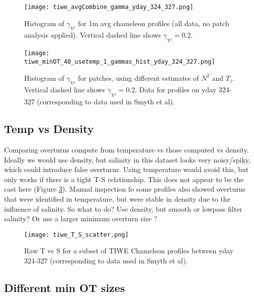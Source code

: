 \documentclass[11pt]{article}
\begin{document}
\begin{figure}[htbp]
\texttt{[image: tiwe\_avgCombine\_gamma\_yday\_324\_327.png]}
\caption{Histogram of $\gamma_{\chi\epsilon}$ for 1m avg chameleon profiles (all data, no patch analysis applied). Vertical dashed line shows $\gamma_{\chi\epsilon}=0.2$.}
\label{avggam}
\end{figure}


\begin{figure}[htbp]
\texttt{[image: tiwe\_minOT\_40\_usetemp\_1\_gammas\_hist\_yday\_324\_327.png]}
\caption{Histogram of $\gamma_{\chi\epsilon}$ for patches, using different estimates of $N^2$ and $T_z$. Vertical dashed line shows $\gamma_{\chi\epsilon}=0.2$. Data for profiles on yday 324-327 (corresponding to data used in Smyth et al).}
\label{patchgam}
\end{figure}



\clearpage
\subsection{Temp vs Density}

Comparing overturns compute from temperature vs those computed vs density. Ideally we would use density, but salinity in this dataset looks very noisy/spiky, which could introduce false overturns. Using temperature would avoid this, but only works if there is a tight T-S relationship. This does not appear to be the cast here (Figure \ref{TSplot}). Manual inspection fo some profiles also showed overturns that were identified in temperature, but were stable in density due to the influence of salinity. So what to do? Use density, but smooth or lowpass filter salinity? Or use a larger minimum overturn size ?

\begin{figure}[htbp]
\texttt{[image: tiwe\_T\_S\_scatter.png]}
\caption{ Raw T vs S for a subset of TIWE Chameleon profiles between yday 324-327 (corresponding to data used in Smyth et al).}
\label{TSplot}
\end{figure}





\clearpage
\subsection{Different min OT sizes}
\end{document}
